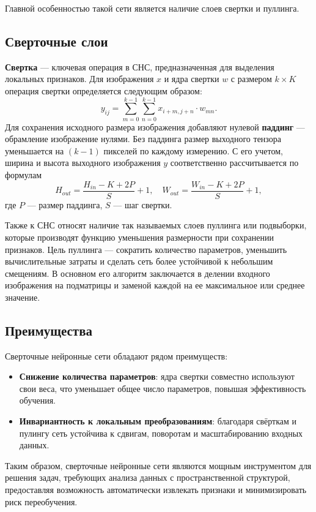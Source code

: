 \documentclass[12pt, a4paper]{article}
\begin{document}
Главной особенностью такой сети является наличие слоев свертки и пуллинга.

\subsection{Сверточные слои}

\textbf{Свертка} — ключевая операция в СНС, предназначенная для выделения локальных признаков. Для изображения \(x\) и ядра свертки \(w\) с размером \(k \times K\) операция свертки определяется следующим образом:
\[
y_{ij} = \sum_{m=0}^{k-1} \sum_{n=0}^{k-1} x_{i+m, j+n} \cdot w_{mn}.
\]
Для сохранения исходного размера изображения добавляют нулевой \textbf{паддинг} --- обрамление изображение нулями.  Без паддинга размер выходного тензора уменьшается на $(k - 1)$ пикселей по каждому измерению. С его учетом, ширина и высота выходного изображения \(y\) соответственно рассчитывается по формулам
\[
H_{out} = \frac{H_{in} - K + 2P}{S} + 1, \quad W_{out} = \frac{W_{in} - K + 2P}{S} + 1,
\]
где \(P\) — размер паддинга, \(S\) — шаг свертки.

Также к СНС относят наличие так называемых слоев пуллинга или подвыборки, которые производят функцию уменьшения размерности при сохранении признаков. Цель пуллинга — сократить количество параметров, уменьшить вычислительные затраты и сделать сеть более устойчивой к небольшим смещениям. В основном его алгоритм заключается в делении входного изображения на подматрицы и заменой каждой на ее максимальное или среднее значение.

\subsection{Преимущества}
Сверточные нейронные сети обладают рядом преимуществ:
\begin{itemize}
	\item \textbf{Снижение количества параметров}: ядра свертки совместно используют свои веса, что уменьшает общее число параметров, повышая эффективность обучения.
	\item \textbf{Инвариантность к локальным преобразованиям}: благодаря свёрткам и пулингу сеть устойчива к сдвигам, поворотам и масштабированию входных данных.
\end{itemize}

Таким образом, сверточные нейронные сети являются мощным инструментом для решения задач, требующих анализа данных с пространственной структурой, предоставляя возможность автоматически извлекать признаки и минимизировать риск переобучения.
\end{document}
